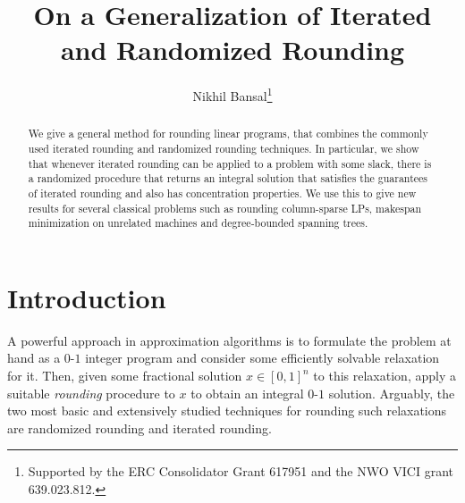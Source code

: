 \documentclass{toc}
\begin{document}
\begin{frontmatter} %
  
%
%

%
%

%
  \title{On a Generalization of Iterated and Randomized Rounding}

%
%
%
%
%
%
%
%
%
%
%
%


%
%
%
%

%


\author[bansal]{Nikhil  Bansal\thanks{Supported by the ERC Consolidator Grant 617951
  and the NWO VICI grant 639.023.812.}}
%

%
%
%
%

%
%
%
%
%
%
\begin{abstract}
  We give a general method for rounding linear programs, that combines the commonly used iterated rounding and randomized rounding techniques. In particular, we show that whenever iterated rounding can be applied to a problem with some slack, there is a randomized procedure that returns an integral solution that satisfies the guarantees of iterated rounding and also has concentration properties.
We use this to give new results for several classical problems such as rounding column-sparse LPs, makespan minimization on unrelated machines and degree-bounded spanning trees.
\end{abstract}

%

\end{frontmatter}

%
%
%

\section{Introduction}
A powerful approach in approximation algorithms is to formulate the
problem at hand as a $0$-$1$ integer program
and consider some efficiently solvable relaxation for it. Then, given
some fractional solution $x\in [0,1]^n$ to this relaxation, apply a suitable
\emph{rounding} procedure to $x$ to obtain an integral $0$-$1$ solution.
Arguably, the two most basic and extensively studied techniques for rounding such relaxations are randomized rounding and iterated rounding.
\end{document}
